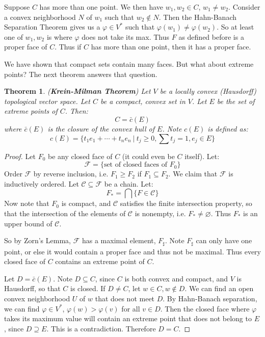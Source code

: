 \documentclass[a4paper,12pt]{report}
\newcommand{\ms}[1]{\mathscr{#1}}
\newcommand{\sse} {\subseteq}
\newcommand{\vphi} {\varphi}
\newtheorem{theorem}{Theorem}[section]
\begin{document}
	Suppose $C$ has more than one point. We then have $w_1, w_2 \in C$, $w_1 \neq w_2$. Consider a convex neighborhood $N$ of $w_1$ such that $w_2 \notin N$. Then the Hahn-Banach Separation Theorem gives us a $\vphi \in V^*$ such that $\vphi(w_1) \neq \vphi(w_2)$. So at least one of $w_1, w_2$ is where $\vphi$ does not take its max. Thus $F$ as defined before is a proper face of $C$. Thus if $C$ has more than one point, then it has a proper face.
	
	We have shown that compact sets contain many faces. But what about extreme points? The next theorem answers that question.
	
	\begin{theorem}
	\emph{(\textbf{Krein-Milman Theorem})}
	Let $V$ be a locally convex (Hausdorff) topological vector space. Let $C$ be a compact, convex set in $V$. Let $E$ be the set of extreme points of $C$. Then:
	\[ C = \bar{c}(E) \]
	where $\bar{c}(E)$ is the closure of the convex hull of $E$. Note $c(E)$ is defined as:
	\[ c(E) = \bigg\{ t_1e_1 + \cdots + t_ne_n ~\big|~ t_j \geq 0, \sum t_j = 1, e_j \in E \bigg\} \]
	\end{theorem}
	\begin{proof}
	Let $F_0$ be any closed face of $C$ (it could even be $C$ itself). Let:
	\[ \ms{F} = \big\{ \text{set of closed faces of $F_0$} \big\} \]
	Order $\ms{F}$ by reverse inclusion, i.e. $F_1 \geq F_2$ if $F_1 \sse F_2$. We claim that $\ms{F}$ is inductively ordered. Let $\ms{C} \sse \ms{F}$ be a chain. Let:
	\[ F_* = \bigcap \big\{F \in \ms{C} \big\} \]
	Now note that $F_0$ is compact, and $\ms{C}$ satisfies the finite intersection property, so that the intersection of the elements of $\ms{C}$ is nonempty, i.e. $F_* \neq \varnothing$. Thus $F_*$ is an upper bound of $\ms{C}$.
	
	So by Zorn's Lemma, $\ms{F}$ has a maximal element, $F_\sharp$. Note $F_\sharp$ can only have one point, or else it would contain a proper face and thus not be maximal. Thus every closed face of $C$ contains an extreme point of $C$. 
	
	Let $D = \bar{c}(E)$. Note $D \sse C$, since $C$ is both convex and compact, and $V$ is Hausdorff, so that $C$ is closed. If $D \neq C$, let $w \in C, w \notin D$. We can find an open convex neighborhood $U$ of $w$ that does not meet $D$. By Hahn-Banach separation, we can find $\vphi \in V^*$, $\vphi(w) > \vphi(v)$ for all $v \in D$. Then the closed face where $\vphi$ takes its maximum value will contain an extreme point that does not belong to $E$, since $D \supseteq E$. This is a contradiction. Therefore $D = C$. 
	\end{proof}
	
\end{document}
